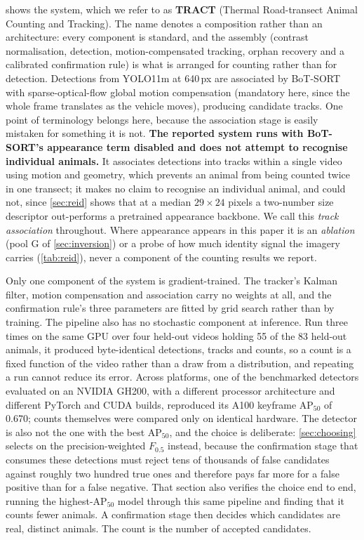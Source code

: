  shows the system, which we refer to as \textbf{TRACT} (Thermal
Road-transect Animal Counting and Tracking). The name denotes a composition rather than an
architecture: every component is standard, and the assembly (contrast normalisation, detection, motion-compensated tracking, orphan recovery and a calibrated confirmation rule) is what is arranged for counting rather than for detection. Detections from YOLO11m at
640\,px are associated by
BoT-SORT~\cite{aharon2022botsort} with sparse-optical-flow global motion compensation (mandatory here, since the whole frame translates as the vehicle moves), producing candidate tracks. One point of terminology belongs here, because the association stage is easily
mistaken for something it is not. \textbf{The reported system runs with BoT-SORT's appearance term disabled and does not attempt to recognise individual animals.} It associates detections into tracks within
a single video using motion and geometry, which prevents an animal from being counted twice in
one transect; it makes no claim to recognise an individual animal, and could not, since
\cref{sec:reid} shows that at a median $29\times24$ pixels a two-number size descriptor
out-performs a pretrained appearance backbone. We call this \emph{track association} throughout. Where appearance appears in this paper it is an
\emph{ablation} (pool G of \cref{sec:inversion}) or a probe of how much identity signal the
imagery carries (\cref{tab:reid}), never a component of the counting results we report.

Only one component of the system is gradient-trained. The tracker's Kalman filter,
motion compensation and association carry no weights at all, and the confirmation rule's three
parameters are fitted by grid search rather than by training. The pipeline also has no
stochastic component at inference. Run three times on the same GPU over four held-out videos
holding 55 of the 83 held-out animals, it produced byte-identical detections, tracks and
counts, so a count is a fixed function of the video rather than a draw from a distribution,
and repeating a run cannot reduce its error. Across platforms, one of the benchmarked detectors
evaluated on an NVIDIA GH200, with a different processor architecture and different PyTorch
and CUDA builds, reproduced its A100 keyframe AP$_{50}$ of 0.670; counts themselves were
compared only on identical hardware. The detector is also not the one
with the best AP$_{50}$, and the choice is deliberate:
\cref{sec:choosing} selects on the precision-weighted $F_{0.5}$ instead, because the
confirmation stage that consumes these detections must reject tens of thousands of false
candidates against roughly two hundred true ones and therefore pays far more for a false
positive than for a false negative. That section also verifies the choice end to end, running
the highest-AP$_{50}$ model through this same pipeline and finding that it counts fewer
animals. A confirmation stage then decides which candidates are real, distinct animals. The
count is the number of accepted candidates.

